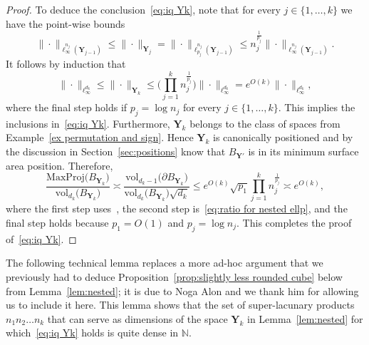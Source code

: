 \documentclass[11pt,reqno]{amsart}
\renewcommand{\le}{\leqslant}
\renewcommand{\k}{\{1,\ldots,k\}}
\newcommand{\Y}{\mathbf Y}
\theoremstyle{remark}
\newcommand{\N}{\mathbb N}
\newcommand{\vol}{\mathrm{vol}}
\renewcommand{\1}{\mathbf 1}
\begin{document}
\begin{proof}
To deduce the conclusion~\eqref{eq:iq Yk}, note that for every $j\in \k$ we have the point-wise bounds
$$
\|\cdot\|_{\ell_{\infty}^{n_j}(\Y_{j-1})}\le \|\cdot\|_{\Y_j}=\|\cdot\|_{\ell_{p_j}^{n_j}(\Y_{j-1})}\le n_j^{\frac{1}{p_j}}\|\cdot\|_{\ell_{\infty}^{n_j}(\Y_{j-1})}.
$$
It follows by induction that
$$
\|\cdot\|_{\ell_\infty^{d_k}}\le \|\cdot\|_{\Y_k}\le \bigg(\prod_{j=1}^k n_j^{\frac{1}{p_j}}\bigg)\|\cdot\|_{\ell_\infty^{d_k}}=e^{O(k)}\|\cdot\|_{\ell_\infty^{d_k}},
$$
where the final step holds if $p_j=\log n_j$ for every $j\in \k$. This implies the inclusions in~\eqref{eq:iq Yk}. Furthermore,  $\Y_k$ belongs to the class of spaces from Example~\ref{ex permutation and sign}. Hence $\Y_k$ is canonically positioned and by the discussion in  Section~\ref{sec:positions} know that $B_{\Y'}$ is in its minimum surface area position. Therefore,
$$
\frac{\mathrm{MaxProj}\big(B_{\Y_k}\big)}{\vol_{d_k}\big(B_{\Y_k}\big)}\asymp \frac{\vol_{d_k-1}\big(\partial B_{\Y_k}\big)}{\vol_{d_k}\big(B_{\Y_k}\big)\sqrt{d_k}}\le e^{O(k)}\sqrt{p_1}\prod_{j=1}^k n_j^{\frac{1}{p_j}}\asymp e^{O(k)},
$$
where the first step uses~\cite[Proposition~3.1]{GP99}, the second step is~\eqref{eq:ratio for nested ellp}, and the final step holds because  $p_1=O(1)$ and $p_j=\log n_j$. This completes the proof of~\eqref{eq:iq Yk}.
\end{proof}


The following technical lemma replaces a more ad-hoc argument that we previously had to deduce Proposition~\ref{prop:slightly less rounded cube} below from Lemma~\ref{lem:nested}; it is due to Noga Alon and we thank him for allowing us to include it here. This lemma shows that the set of super-lacunary products $n_1n_2\ldots n_k$ that can serve as dimensions of the space $\Y_k$ in Lemma~\ref{lem:nested} for which~\eqref{eq:iq Yk} holds is quite dense in $\N$.
\end{document}
